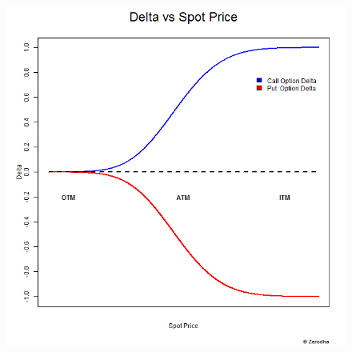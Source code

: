 \documentclass{article}
\begin{document}
\begin{itemize}
\begin{figure}[H]
              \includegraphics[scale=0.4]{Delta.png}
          \end{figure}


\end{itemize}
\end{document}
